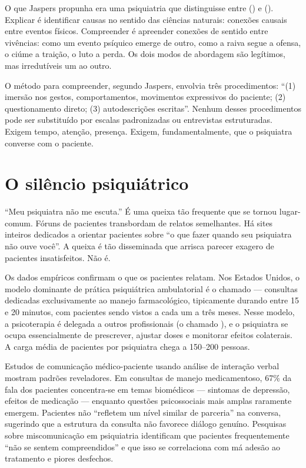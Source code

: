 O que Jaspers propunha era uma psiquiatria que distinguisse entre  () e  (). Explicar é identificar causas no sentido das ciências naturais: conexões causais entre eventos físicos. Compreender é apreender conexões de sentido entre vivências: como um evento psíquico emerge de outro, como a raiva segue a ofensa, o ciúme a traição, o luto a perda. Os dois modos de abordagem são legítimos, mas irredutíveis um ao outro.

O método para compreender, segundo Jaspers, envolvia três procedimentos: \enquote{(1) imersão nos gestos, comportamentos, movimentos expressivos do paciente; (2) questionamento direto; (3) autodescrições escritas}. Nenhum desses procedimentos pode ser substituído por escalas padronizadas ou entrevistas estruturadas. Exigem tempo, atenção, presença. Exigem, fundamentalmente, que o psiquiatra converse com o paciente.

\section{O silêncio psiquiátrico}
\label{sec:silencio}

\enquote{Meu psiquiatra não me escuta.} É uma queixa tão frequente que se tornou lugar-comum. Fóruns de pacientes transbordam de relatos semelhantes. Há sites inteiros dedicados a orientar pacientes sobre \enquote{o que fazer quando seu psiquiatra não ouve você}. A queixa é tão disseminada que arrisca parecer exagero de pacientes insatisfeitos. Não é.

Os dados empíricos confirmam o que os pacientes relatam. Nos Estados Unidos, o modelo dominante de prática psiquiátrica ambulatorial é o chamado  --- consultas dedicadas exclusivamente ao manejo farmacológico, tipicamente durando entre 15 e 20 minutos, com pacientes sendo vistos a cada um a três meses. Nesse modelo, a psicoterapia é delegada a outros profissionais (o chamado ), e o psiquiatra se ocupa essencialmente de prescrever, ajustar doses e monitorar efeitos colaterais. A carga média de pacientes por psiquiatra chega a 150--200 pessoas.

Estudos de comunicação médico-paciente usando análise de interação verbal mostram padrões reveladores. Em consultas de manejo medicamentoso, 67\% da fala dos pacientes concentra-se em temas biomédicos --- sintomas de depressão, efeitos de medicação --- enquanto questões psicossociais mais amplas raramente emergem. Pacientes não \enquote{refletem um nível similar de parceria} na conversa, sugerindo que a estrutura da consulta não favorece diálogo genuíno. Pesquisas sobre miscomunicação em psiquiatria identificam que pacientes frequentemente \enquote{não se sentem compreendidos} e que isso se correlaciona com má adesão ao tratamento e piores desfechos.

